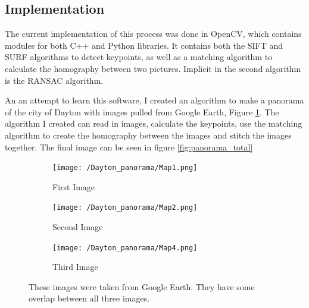 \documentclass[12pt]{article} %
\begin{document}
\subsection{Implementation}
	The current implementation of this process was done in OpenCV, which contains modules for both C++ and Python libraries. It contains both the SIFT and SURF algorithms to detect keypoints, as well as a matching algorithm to calculate the homography between two pictures. Implicit in the second algorithm is the RANSAC algorithm. 

	An an attempt to learn this software, I created an algorithm to make a panorama of the city of Dayton with images pulled from Google Earth, Figure \ref{fig:Panorama_individual}. The algorithm I created can read in images, calculate the keypoints, use the matching algorithm to create the homography between the images and stitch the images together. The final image can be seen in figure \ref{fig:panorama_total}
	
\begin{figure}
\begin{subfigure}[t]{.5\textwidth}
\centering
\texttt{[image: /Dayton\_panorama/Map1.png]}
\caption{First Image}
\end{subfigure}
\hfill
\begin{subfigure}[t]{.5\textwidth}
\centering
\texttt{[image: /Dayton\_panorama/Map2.png]}
\caption{Second Image}
\end{subfigure}

\begin{subfigure}[t]{.6\textwidth}
\centering
\texttt{[image: /Dayton\_panorama/Map4.png]}
\caption{Third Image}
\end{subfigure}


\caption{These images were taken from Google Earth. They have some overlap between all three images.}

\label{fig:Panorama_individual}
\end{figure}
\end{document}
